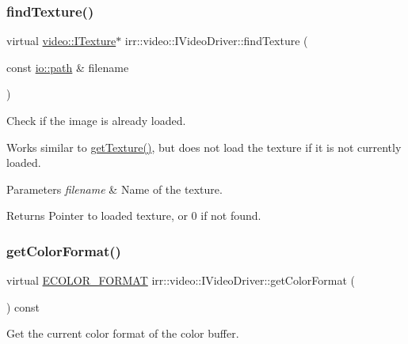 \subsubsection{\texorpdfstring{find\+Texture()}{findTexture()}}
{\footnotesize\ttfamily virtual \hyperlink{classirr_1_1video_1_1ITexture}{video\+::\+I\+Texture}$\ast$ irr\+::video\+::\+I\+Video\+Driver\+::find\+Texture (\begin{DoxyParamCaption}\item[{const \hyperlink{namespaceirr_1_1io_ab1bdc45edb3f94d8319c02bc0f840ee1}{io\+::path} \&}]{filename }\end{DoxyParamCaption})\hspace{0.3cm}{\ttfamily [pure virtual]}}



Check if the image is already loaded. 

Works similar to \hyperlink{classirr_1_1video_1_1IVideoDriver_af4055165190e4adf221c6dc6f2434ea0}{get\+Texture()}, but does not load the texture if it is not currently loaded. 
\begin{DoxyParams}{Parameters}
{\em filename} & Name of the texture. \\
\hline
\end{DoxyParams}
\begin{DoxyReturn}{Returns}
Pointer to loaded texture, or 0 if not found. 
\end{DoxyReturn}
\mbox{\label{classirr_1_1video_1_1IVideoDriver_afc8f27bfd9756f4ca8de2d4bb37b0e15}} 
\subsubsection{\texorpdfstring{get\+Color\+Format()}{getColorFormat()}}
{\footnotesize\ttfamily virtual \hyperlink{namespaceirr_1_1video_a1d5e487888c32b1674a8f75116d829ed}{E\+C\+O\+L\+O\+R\+\_\+\+F\+O\+R\+M\+AT} irr\+::video\+::\+I\+Video\+Driver\+::get\+Color\+Format (\begin{DoxyParamCaption}{ }\end{DoxyParamCaption}) const\hspace{0.3cm}{\ttfamily [pure virtual]}}



Get the current color format of the color buffer. 

